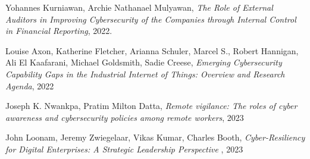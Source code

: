 \documentclass[journal]{IEEEtran}
\begin{document}
\begin{thebibliography}{1}
Yohannes Kurniawan, Archie Nathanael Mulyawan, \emph{The Role of External Auditors in Improving Cybersecurity of the Companies through Internal Control in Financial Reporting}, 2022.

Louise Axon, Katherine Fletcher, Arianna Schuler, Marcel S., Robert Hannigan, Ali El Kaafarani, Michael Goldsmith, Sadie Creese, \emph{Emerging Cybersecurity Capability Gaps in the Industrial Internet of Things: Overview and Research Agenda}, 2022

Joseph K. Nwankpa, Pratim Milton Datta,
\emph{Remote vigilance: The roles of cyber awareness and cybersecurity policies among remote workers}, 2023

John Loonam, Jeremy Zwiegelaar, Vikas Kumar, Charles Booth,
\emph{Cyber-Resiliency for Digital Enterprises: A Strategic Leadership Perspective  }, 2023

% 






\end{thebibliography}

\end{document}
